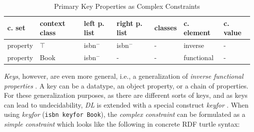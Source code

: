 \documentclass[a4paper,fontsize=11pt]{scrartcl}
\newcommand{\ms}[1]{\texttt{#1}}
\begin{document}
\begin{table}[H]
  \scriptsize
  \sffamily
  \vspace{0cm}
	\caption{Primary Key Properties as Complex Constraints}
	\label{tab:primary-key-properties-as-complex-constraints}
	\centering
		\begin{tabular}{l|l|l|l|l|l|l}
      \textbf{c. set} & \textbf{context class} & \textbf{left p. list} & \textbf{right p. list} & \textbf{classes} & \textbf{c. element} & \textbf{c. value} \\
      \hline
property & $\top$ & isbn$^{-}$ & isbn$^{-}$ & - & inverse & - \\
property & Book & isbn$^{-}$ & - & - & functional & - \\
		\end{tabular}
\end{table}

\emph{Keys}, however, are even more general, i.e., a generalization of \emph{inverse functional properties} \cite{Schneider2009}.
A key can be a datatype, an object property, or a chain of properties.
For these generalization purposes, as there are different sorts of keys, and as keys can lead to undecidability, 
\emph{DL} is extended with a special construct \emph{keyfor} \cite{Lutz2005}.
When using \emph{keyfor} (\ms{isbn keyfor Book}), 
the \emph{complex constraint} can be formulated as a \emph{simple constraint} which looks like the following in concrete RDF turtle syntax:


\end{document}
